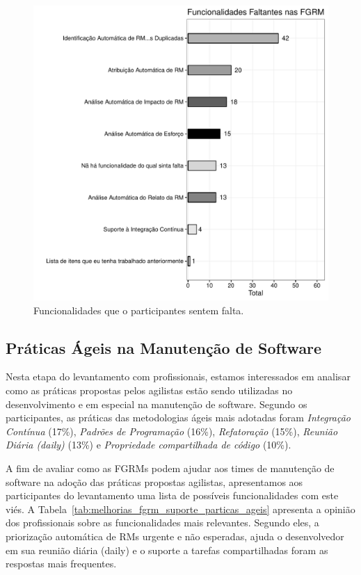 \begin{figure}[htpb]
	\centering
	\includegraphics[width=0.7\linewidth]{./chapter-pesquisa-com-profissionais/img/grafico_melhorias_fgrm_funcionalidades_faltantes.pdf}
	\caption{Funcionalidades que o participantes sentem falta.}
\label{fig:grafico_melhorias_fgrm_funcionalidades_falantes}
\end{figure}

\subsection{Práticas Ágeis na Manutenção de Software}
\label{sub:práticas_ágeis_na_manutenção_de_software}

Nesta etapa do levantamento com profissionais, estamos interessados em analisar
como as práticas propostas pelos agilistas estão sendo utilizadas no
desenvolvimento e em especial na manutenção de software. Segundo os
participantes, as práticas das metodologias ágeis mais adotadas foram
\textit{Integração Contínua} (17\%), \textit{Padrões de Programação} (16\%),
\textit{Refatoração} (15\%), \textit{Reunião Diária (daily)} (13\%) e
\textit{Propriedade compartilhada de código} (10\%).

A fim de avaliar como as FGRMs podem ajudar aos times de manutenção de software
na adoção das práticas propostas agilistas, apresentamos aos participantes do
levantamento uma lista de possíveis funcionalidades com este viés. A
Tabela~\ref{tab:melhorias_fgrm_suporte_particas_ageis} apresenta a opinião dos
profissionais sobre as funcionalidades mais relevantes. Segundo eles, a
priorização automática de RMs urgente e não esperadas, ajuda o desenvolvedor em
sua reunião diária (daily) e o suporte a tarefas compartilhadas foram as
respostas mais frequentes.

